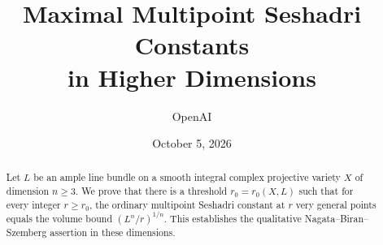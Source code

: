 \documentclass[11pt]{article}
\title{Maximal Multipoint Seshadri Constants\protect\\ in Higher Dimensions}
\author{OpenAI}
\date{October 5, 2026}
\numberwithin{equation}{section}
\theoremstyle{definition}
\begin{document}
\maketitle
\begin{abstract}
Let $L$ be an ample line bundle on a smooth integral complex projective variety
$X$ of dimension $n\ge3$. We prove that there is a threshold
$r_0=r_0(X,L)$ such that for every integer $r\ge r_0$, the ordinary multipoint
Seshadri constant at $r$ very general points equals the volume bound
$(L^n/r)^{1/n}$. This establishes the qualitative Nagata--Biran--Szemberg
assertion in these dimensions.
\end{abstract}








\end{document}
